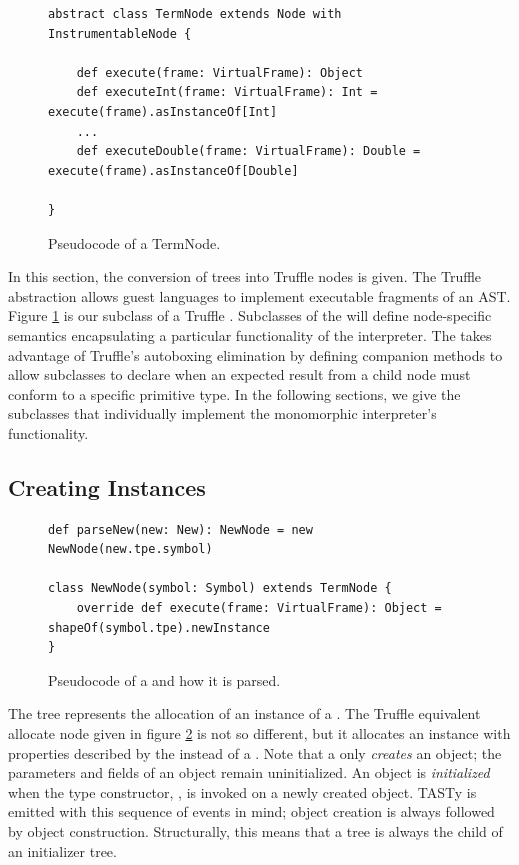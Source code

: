 \begin{figure}[!htb]
\begin{verbatim}
abstract class TermNode extends Node with InstrumentableNode {

	def execute(frame: VirtualFrame): Object 
	def executeInt(frame: VirtualFrame): Int = execute(frame).asInstanceOf[Int]
	...
	def executeDouble(frame: VirtualFrame): Double = execute(frame).asInstanceOf[Double]

}
\end{verbatim}
\caption{Pseudocode of a TermNode.}
\label{impl:term-node}
\end{figure}

In this section, the conversion of  trees into Truffle nodes is given.
The Truffle  abstraction allows guest languages to implement executable fragments of an AST.
Figure \ref{impl:term-node} is our subclass of a Truffle .
Subclasses of the  will define node-specific semantics encapsulating a particular functionality of the interpreter.
The  takes advantage of Truffle's autoboxing elimination by defining companion  methods to allow subclasses to declare when an expected result from a child node must conform to a specific primitive type.
In the following sections, we give the subclasses that individually implement the monomorphic interpreter's functionality.

\subsection{Creating Instances}

\begin{figure}[!htb]
\begin{verbatim}
def parseNew(new: New): NewNode = new NewNode(new.tpe.symbol)	

class NewNode(symbol: Symbol) extends TermNode {
	override def execute(frame: VirtualFrame): Object =  shapeOf(symbol.tpe).newInstance
}
\end{verbatim}
\caption{Pseudocode of a  and how it is parsed.}
\label{impl:new-node}
\end{figure}

The  tree represents the allocation of an instance of a .
The Truffle equivalent allocate node given in figure \ref{impl:new-node} is not so different, but it allocates an instance with properties described by the  instead of a .
Note that a  only \textit{creates} an object; the parameters and fields of an object remain uninitialized.
An object is \textit{initialized} when the type constructor, , is invoked on a newly created object.
TASTy is emitted with this sequence of events in mind; object creation is always followed by object construction.
Structurally, this means that a  tree is always the child of an initializer  tree.

